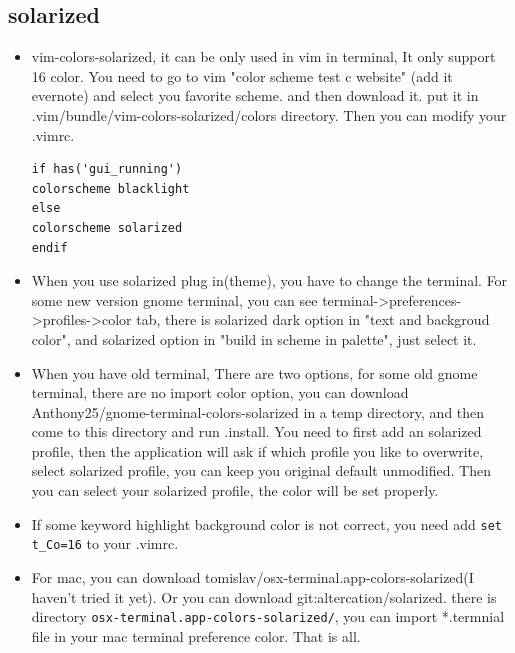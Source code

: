 \documentclass[a4paper,12pt,twoside]{book}
\begin{document}
\subsection{solarized}
\begin{itemize}
	\item vim-colors-solarized, it can be only used in vim in terminal, It only support 16 color. You need to go to  vim "color scheme test c website" (add it evernote) and select you favorite scheme. and then download it. put it in .vim/bundle/vim-colors-solarized/colors directory. Then you can modify your .vimrc.
	
\begin{verbatim}
if has('gui_running')
colorscheme blacklight
else
colorscheme solarized
endif 
\end{verbatim}
	\item When you use solarized plug in(theme), you have to change the terminal. For some new version gnome terminal, you can see terminal->preferences->profiles->color tab, there is solarized dark option in "text and backgroud color", and solarized option in "build in scheme in palette", just select it.

    \item When you have old terminal, There are two options, for some old gnome
        terminal, there are no import color option, you can download
        Anthony25/gnome-terminal-colors-solarized in a temp directory, and then
        come to this directory and run .install. You need to first add an solarized profile, then the application will ask if which profile you like to overwrite, select solarized profile, you can keep you original default unmodified. Then you can select your solarized profile, the color will be set properly. 

\item If some keyword highlight background color is not correct, you need add \verb!set t_Co=16! to your .vimrc. 

		\item For mac, you can download
        tomislav/osx-terminal.app-colors-solarized(I haven't tried it yet). Or
        you can download git:altercation/solarized. there is directory \verb!osx-terminal.app-colors-solarized/!, you can import *.termnial file in
        your mac terminal preference color. That is all.
\end{itemize}
\end{document}

